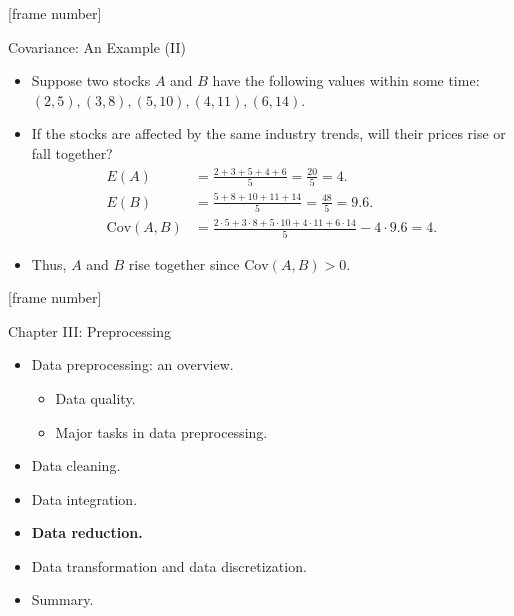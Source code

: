\documentclass[aspectratio=169,t]{beamer}
\begin{document}
  {
    [frame number]
    \begin{frame}{Covariance: An Example (II)}
    \begin{itemize}
      \item Suppose two stocks $A$ and $B$ have the following values within some time:\\
      $(2,5), (3,8), (5,10), (4,11), (6,14).$
      \item If the stocks are affected by the same industry trends, will their prices rise or fall together?
      \begin{align}
        E(A) &= \frac{2+3+5+4+6}{5} = \frac{20}{5} = 4.\\
        E(B) &= \frac{5+8+10+11+14}{5} = \frac{48}{5} = 9.6.\\
        \text{Cov}(A,B) &= \frac{2\cdot5 + 3\cdot 8 + 5 \cdot 10 + 4 \cdot 11 + 6 \cdot 14}{5} - 4\cdot 9.6 = 4.
      \end{align}
      \item Thus, $A$ and $B$ rise together since $\text{Cov}(A,B) > 0$.
    \end{itemize}
    \end{frame}
  }

  {
    [frame number]
    \begin{frame}{Chapter III: Preprocessing}
        \begin{itemize}
            \item Data preprocessing: an overview.
            \begin{itemize}
              \item Data quality.
              \item Major tasks in data preprocessing.
            \end{itemize}
            \item Data cleaning.
            \item Data integration.
            \item \textbf{Data reduction.}
            \item Data transformation and data discretization.
            \item Summary.
        \end{itemize}
    \end{frame}
  }
\end{document}
